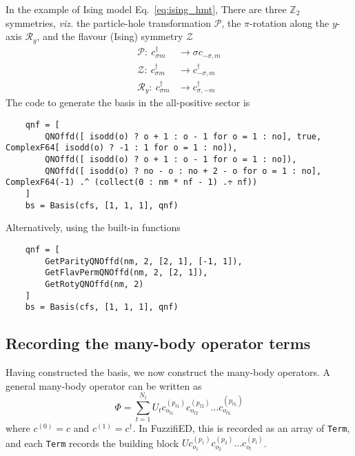\documentclass{timesjhep}
\begin{document}
In the example of Ising model Eq.~\eqref{eq:ising_hmt}, There are three $\mathbb{Z}_2$ symmetries, \textit{viz.} the particle-hole transformation $\mathscr{P}$, the $\pi$-rotation along the $y$-axis $\mathscr{R}_y$, and the flavour (Ising) symmetry $\mathscr{Z}$
\begin{align}
    \mathscr{P}:\ c^\dagger_{\sigma m}&\to\sigma c_{-\sigma,m}\nonumber\\
    \mathscr{Z}:\ c^\dagger_{\sigma m}&\to c^\dagger_{-\sigma,m}\nonumber\\
    \mathscr{R}_y:\ c^\dagger_{\sigma m}&\to c^\dagger_{\sigma,-m}
\end{align}
The code to generate the basis in the all-positive sector is 
\begin{lstlisting}
    qnf = [
        QNOffd([ isodd(o) ? o + 1 : o - 1 for o = 1 : no], true, ComplexF64[ isodd(o) ? -1 : 1 for o = 1 : no]),
        QNOffd([ isodd(o) ? o + 1 : o - 1 for o = 1 : no]),
        QNOffd([ isodd(o) ? no - o : no + 2 - o for o = 1 : no], ComplexF64(-1) .^ (collect(0 : nm * nf - 1) .÷ nf))
    ]
    bs = Basis(cfs, [1, 1, 1], qnf) 
\end{lstlisting}
Alternatively, using the built-in functions
\begin{lstlisting}
    qnf = [ 
        GetParityQNOffd(nm, 2, [2, 1], [-1, 1]), 
        GetFlavPermQNOffd(nm, 2, [2, 1]), 
        GetRotyQNOffd(nm, 2) 
    ]
    bs = Basis(cfs, [1, 1, 1], qnf)
\end{lstlisting}

\subsection{Recording the many-body operator terms}
\label{sec:ed_opmat}

Having constructed the basis, we now construct the many-body operators. A general many-body operator can be written as
\begin{equation}
    \Phi=\sum_{t=1}^{N_t}U_tc^{(p_{t1})}_{o_{t1}}c^{(p_{t2})}_{o_{t2}}\dots c^{(p_{tl_t})}_{o_{tl_t}}
\end{equation}
where $c^{(0)}=c$ and $c^{(1)}=c^\dagger$. In FuzzifiED, this is recorded as an array of \lstinline|Term|, and each \lstinline|Term| records the building block $Uc^{(p_{1})}_{o_{1}}c^{(p_{2})}_{o_{2}}\dots c^{(p_{l})}_{o_{l}}$. 
\end{document}
